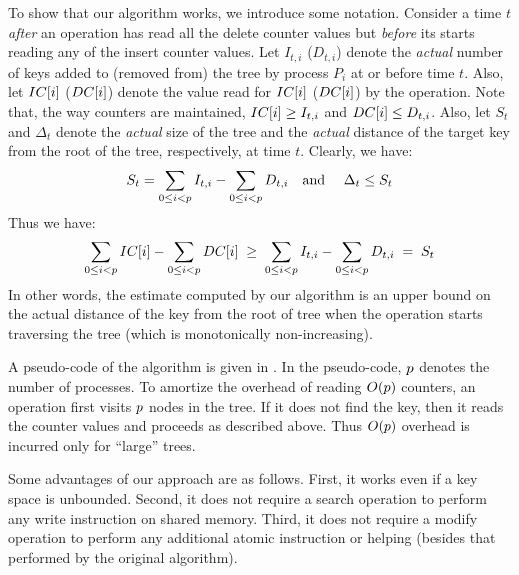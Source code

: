 \begin{limitscope}
To show that our algorithm works, we introduce some notation. Consider a time $t$ \emph{after} an operation has read all the delete counter values but \emph{before} its starts reading any of the insert counter values. Let $I_{t,i}$ ($D_{t,i}$) denote the \emph{actual} number of keys added to (removed from) the tree by process $P_i$ at or before time $t$. Also, let $IC[i]$ ($DC[i]$) denote the value read for $IC[i]$ ($DC[i]$) by the operation. Note that, the way counters are maintained, $IC[i] \geq I_{t,i}$ and $DC[i] \leq D_{t,i}$. Also, let $S_t$ and $\Delta_t$ denote the \emph{actual} size of the tree and the \emph{actual} distance of the target key from the root of the tree, respectively, at time $t$. Clearly, we have:
\[
S_t = \sum_{0 \leq i < p} I_{t,i} - \sum_{0 \leq i < p} D_{t,i} \text{\quad and \quad} \Delta_t \leq S_t
\]
Thus we have:
\[
\sum_{0 \leq i < p} IC[i] - \sum_{0 \leq i < p} DC[i]  \; \geq \; \sum_{0 \leq i < p} I_{t,i} - \sum_{0 \leq i < p} D_{t,i} \; = \; S_t 
\]
In other words, the estimate computed by our algorithm is an upper bound on the actual distance of the key from the root of tree when the operation starts traversing the tree (which is monotonically non-increasing).

A pseudo-code of the algorithm is given in . In the pseudo-code, $p$ denotes the number of processes. To amortize the overhead of reading $O(p)$ counters, an operation first visits $p$ nodes in the tree. If it does not find the key, then it reads the counter values and proceeds as described above. Thus $O(p)$ overhead is incurred only for ``large'' trees.

Some advantages of our approach are as follows. First, it works even if a key space is unbounded. Second, it does not require a search operation to perform any write instruction on shared memory. Third, it does not require a modify operation to perform any additional atomic instruction or helping (besides that performed by the original algorithm). 




\end{limitscope}
